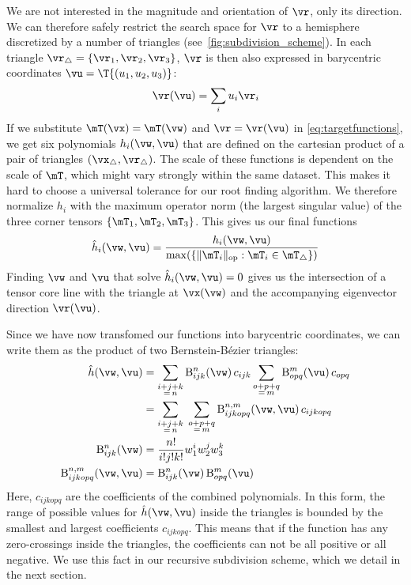 %
We are not interested in the magnitude and orientation of $\vr$, only its
direction.
%
We can therefore safely restrict the search space for $\vr$ to a hemisphere
discretized by a number of triangles (see~\autoref{fig:subdivision_scheme}).
%
In each triangle $\vr_\triangle = \{\vr_1, \vr_2, \vr_3\}$, $\vr$ is then also
expressed in barycentric coordinates $\vu = \T{(u_1, u_2, u_3)}$:
%
\begin{equation}
  \vr(\vu) = \sum_i u_i \vr_i
\end{equation}
%
If we substitute $\mT(\vx) = \mT(\vw)$ and $\vr = \vr(\vu)$ in
\eqref{eq:targetfunctions}, we get six polynomials $h_i(\vw, \vu)$
that are defined on the cartesian product of a pair of triangles
$(\vx_\triangle, \vr_\triangle)$.
%
The scale of these functions is dependent on the scale of $\mT$, which might
vary strongly within the same dataset.
%
This makes it hard to choose a universal tolerance for our root finding
algorithm.
%
We therefore normalize $h_i$ with the maximum operator norm (the largest
singular value) of the three corner tensors $\{\mT_1, \mT_2, \mT_3\}$.
%
This gives us our final functions
%
\begin{equation}
  \hat{h}_i(\vw, \vu) = \frac{h_i(\vw, \vu)}
      {\max(\{\|\mT_i\|_{\mathrm{op}} : \mT_i \in \mT_\triangle\})}
\end{equation}
%
Finding $\vw$ and $\vu$ that solve $\hat{h}_i(\vw, \vu) = 0$ gives us the
intersection of a tensor core line with the triangle at $\vx(\vw)$ and the
accompanying eigenvector direction $\vr(\vu)$.
%

%
Since we have now transfomed our functions into barycentric coordinates, we can
write them as the product of two Bernstein-B\'ezier triangles:
%
\begin{align}
\hat{h}(\vw, \vu) &= \sum_{\substack{i+j+k\\=\,n}} \mathrm{B}_{ijk}^n(\vw)\, c_{ijk}
                \sum_{\substack{o+p+q\\=\,m}} \mathrm{B}_{opq}^m(\vu)\, c_{opq} \\
            &= \sum_{\substack{i+j+k\\=\,n}} \; \sum_{\substack{o+p+q\\=\,m}}
              \mathrm{B}_{ijkopq}^{n, m}(\vw, \vu)\, c_{ijkopq} \\
\mathrm{B}_{ijk}^n(\vw) &= \frac{n!}{i!j!k!} w_1^i w_2^j w_3^k \\
\mathrm{B}_{ijkopq}^{n, m}(\vw, \vu) &= \mathrm{B}_{ijk}^n(\vw) \, \mathrm{B}_{opq}^m(\vu)
\end{align}
%
Here, $c_{ijkopq}$ are the coefficients of the combined polynomials.
%
In this form, the range of possible values for $\hat{h}(\vw, \vu)$ inside the
triangles is bounded by the smallest and largest coefficients $c_{ijkopq}$.
%
This means that if the function has any zero-crossings inside the triangles,
the coefficients can not be all positive or all negative.
%
We use this fact in our recursive subdivision scheme, which we detail in the
next section.
% 

